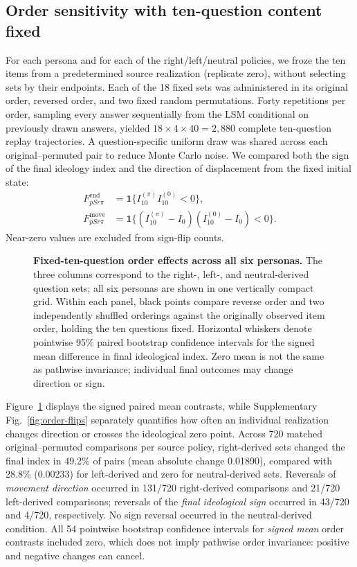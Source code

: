 \subsection{Order sensitivity with ten-question content fixed}
For each persona and for each of the right/left/neutral policies, we froze
the ten items from a predetermined source realization (replicate zero),
without selecting sets by their endpoints. Each of the 18 fixed sets was
administered in its original order, reversed order, and two fixed random
permutations. Forty repetitions per order, sampling every answer
sequentially from the LSM conditional on previously drawn answers, yielded
$18\times4\times40=2{,}880$ complete ten-question replay trajectories.
A question-specific uniform draw was shared across each original--permuted
pair to reduce Monte Carlo noise. We compared both the sign of the final
ideology index and the direction of displacement from the fixed initial state:
\begin{align}
F_{pSr\pi}^{\mathrm{end}}
&=\mathbf 1\{I_{10}^{(\pi)} I_{10}^{(0)}<0\},\\
F_{pSr\pi}^{\mathrm{move}}
&=\mathbf 1\{(I_{10}^{(\pi)}-I_0)(I_{10}^{(0)}-I_0)<0\}.
\end{align}
Near-zero values are excluded from sign-flip counts.

\begin{figure}[!t]
\centering

\caption{\textbf{Fixed-ten-question order effects across all six personas.}
The three columns correspond to the right-, left-, and neutral-derived
question sets; all six personas are shown in one vertically compact grid.
Within each panel, black points compare reverse order and two independently
shuffled orderings against the originally observed item order, holding
the ten questions fixed. Horizontal whiskers denote pointwise 95\%
paired bootstrap confidence intervals for the signed mean difference in
final ideological index. Zero mean is not the same as pathwise invariance;
individual final outcomes may change direction or sign.}
\label{fig:order-effects}
\end{figure}

Figure~\ref{fig:order-effects} displays the signed paired mean contrasts, while
Supplementary Fig.~\ref{fig:order-flips} separately quantifies how often an individual
realization changes direction or crosses the ideological zero point.
Across 720 matched original--permuted comparisons per source policy,
right-derived sets changed the final index in 49.2\% of pairs (mean absolute
change 0.01890), compared with 28.8\% (0.00233) for left-derived and
zero for neutral-derived sets. Reversals of \emph{movement direction}
occurred in 131/720 right-derived comparisons and 21/720 left-derived
comparisons; reversals of the \emph{final ideological sign} occurred in
43/720 and 4/720, respectively. No sign reversal occurred in the
neutral-derived condition. All 54 pointwise bootstrap confidence intervals
for \emph{signed mean} order contrasts included zero, which does not imply
pathwise order invariance: positive and negative changes can cancel.

